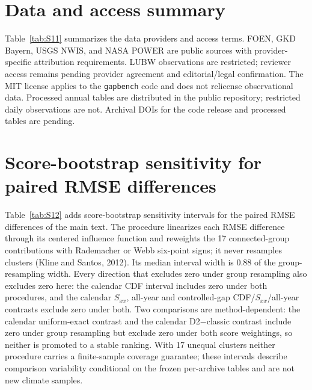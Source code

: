 \documentclass[preprint,12pt]{elsarticle}
\begin{document}


\section{Data and access summary}
Table~\ref{tab:S11} summarizes the data providers and access terms. FOEN, GKD Bayern, USGS NWIS, and NASA POWER are public sources with provider-specific attribution requirements. LUBW observations are restricted; reviewer access remains pending provider agreement and editorial/legal confirmation. The MIT license applies to the \texttt{gapbench} code and does not relicense observational data. Processed annual tables are distributed in the public repository; restricted daily observations are not. Archival DOIs for the code release and processed tables are pending.



\section{Score-bootstrap sensitivity for paired RMSE differences}
Table~\ref{tab:S12} adds score-bootstrap sensitivity intervals for the paired RMSE differences of the main text. The procedure linearizes each RMSE difference through its centered influence function and reweights the 17 connected-group contributions with Rademacher or Webb six-point signs; it never resamples clusters (Kline and Santos, 2012). Its median interval width is 0.88 of the group-resampling width. Every direction that excludes zero under group resampling also excludes zero here: the calendar CDF interval includes zero under both procedures, and the calendar $S_{xx}$, all-year and controlled-gap CDF/$S_{xx}$/all-year contrasts exclude zero under both. Two comparisons are method-dependent: the calendar uniform-exact contrast and the calendar D2$-$classic contrast include zero under group resampling but exclude zero under both score weightings, so neither is promoted to a stable ranking. With 17 unequal clusters neither procedure carries a finite-sample coverage guarantee; these intervals describe comparison variability conditional on the frozen per-archive tables and are not new climate samples.


\end{document}
